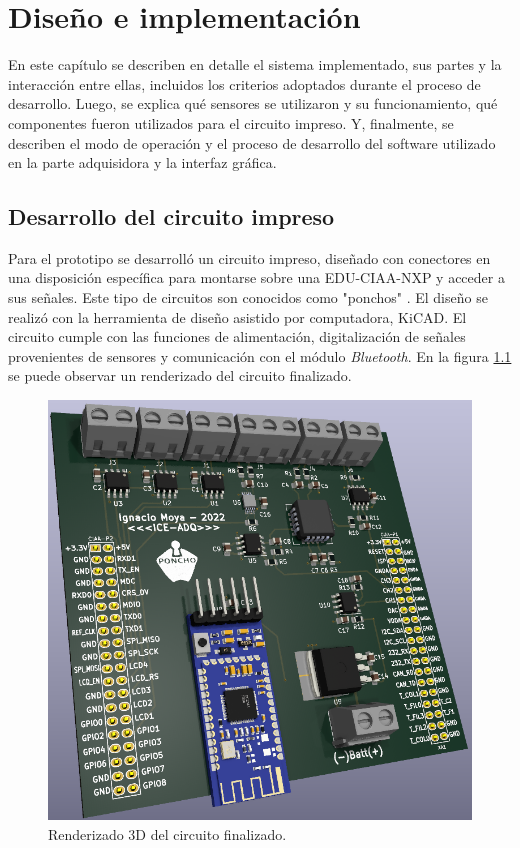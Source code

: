\chapter{Diseño e implementación} %

\label{Chapter3}

En este capítulo se describen en detalle el sistema implementado, sus partes y la interacción entre ellas, incluidos los criterios adoptados durante el proceso de desarrollo. Luego, se explica qué sensores se utilizaron y su funcionamiento, qué componentes fueron utilizados para el circuito impreso. Y, finalmente, se describen el modo de operación y el proceso de desarrollo del software utilizado en la parte adquisidora y la interfaz gráfica.

\section{Desarrollo del circuito impreso} \label{circuito}

Para el prototipo se desarrolló un circuito impreso, diseñado con conectores en una disposición específica para montarse sobre una EDU-CIAA-NXP y acceder a sus señales. Este tipo de circuitos son conocidos como "ponchos" \cite{poncho}. El diseño se realizó con la herramienta de diseño asistido por computadora, KiCAD. El circuito cumple con las funciones de alimentación, digitalización de señales provenientes de sensores y comunicación con el módulo \textit{Bluetooth}. En la figura \ref{fig:circuito-3d} se puede observar un renderizado del circuito finalizado. 

\begin{figure}[htpb]
\centering
\includegraphics[width=.8\textwidth]{./Figures/circuito-3d.png}
\caption{Renderizado 3D del circuito finalizado.}
\label{fig:circuito-3d}
\end{figure}


